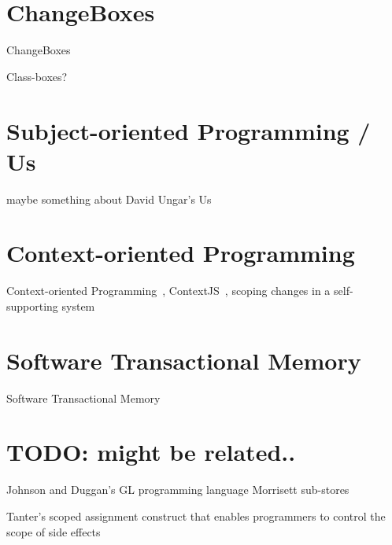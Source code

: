 \section{ChangeBoxes}
ChangeBoxes~\cite{Denker2007EEC}

Class-boxes? 


\section{Subject-oriented Programming / Us}
maybe something about David Ungar's Us~\cite{}


\section{Context-oriented Programming}
Context-oriented Programming~\cite{Hirschfeld2008COP}, ContextJS~\cite{Lincke2011OIC}, scoping changes in a self-supporting system~\cite{Lincke2012SCS}


\section{Software Transactional Memory}
Software Transactional Memory~\cite{Shavit1995STM}



\section{TODO: might be related..}

Johnson and Duggan’s GL programming language 
Morrisett sub-stores 

Tanter's scoped assignment construct  that enables programmers to control the scope of side effects 

